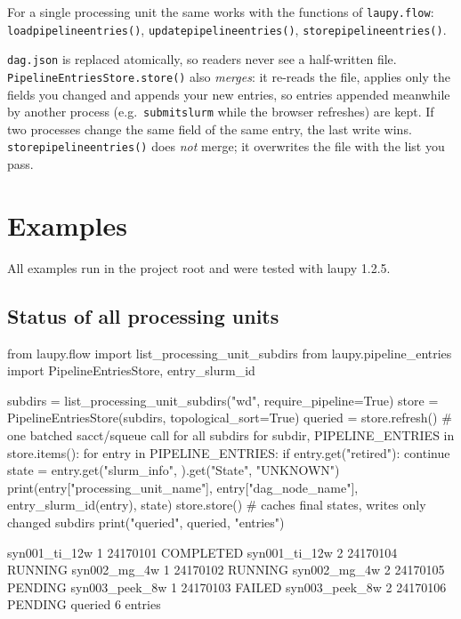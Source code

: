 \documentclass[11pt,a4paper]{article}
\DeclareRobustCommand{\_}{\textunderscore\allowbreak}
\newcommand{\cmd}[1]{\texttt{#1}}
\begin{document}
For a single processing unit the same works with the functions of \cmd{laupy.flow}:
\cmd{load\_pipeline\_entries()}, \cmd{update\_pipeline\_entries()},
\cmd{store\_pipeline\_entries()}.

\begin{note}
\cmd{dag.json} is replaced atomically, so readers never see a half-written file.
\cmd{PipelineEntriesStore.store()} also \emph{merges}: it re-reads the file, applies only the fields
you changed and appends your new entries, so entries appended meanwhile by another process (e.g.\
\cmd{submitslurm} while the browser refreshes) are kept. If two processes change the same field of
the same entry, the last write wins. \cmd{store\_pipeline\_entries()} does \emph{not} merge; it
overwrites the file with the list you pass.
\end{note}

\section{Examples}

All examples run in the project root and were tested with laupy 1.2.5.

\subsection{Status of all processing units}

\begin{code}
from laupy.flow import list_processing_unit_subdirs
from laupy.pipeline_entries import PipelineEntriesStore, entry_slurm_id

subdirs = list_processing_unit_subdirs("wd", require_pipeline=True)
store = PipelineEntriesStore(subdirs, topological_sort=True)
queried = store.refresh()              # one batched sacct/squeue call for all subdirs
for subdir, PIPELINE_ENTRIES in store.items():
    for entry in PIPELINE_ENTRIES:
        if entry.get("retired"):
            continue
        state = entry.get("slurm_info", {}).get("State", "UNKNOWN")
        print(entry["processing_unit_name"], entry["dag_node_name"], entry_slurm_id(entry), state)
store.store()                          # caches final states, writes only changed subdirs
print("queried", queried, "entries")
\end{code}

\begin{terminal}
syn001_ti_12w 1 24170101 COMPLETED
syn001_ti_12w 2 24170104 RUNNING
syn002_mg_4w 1 24170102 RUNNING
syn002_mg_4w 2 24170105 PENDING
syn003_peek_8w 1 24170103 FAILED
syn003_peek_8w 2 24170106 PENDING
queried 6 entries
\end{terminal}
\end{document}
